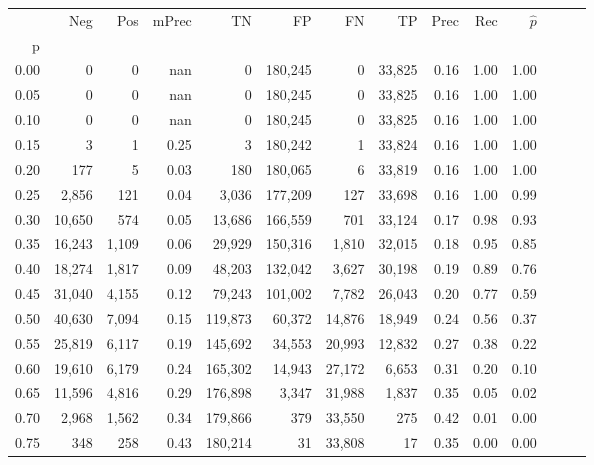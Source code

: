 \begin{tabular}{rrrrrrrrrrrrrr}
\toprule
{} &     Neg &    Pos & mPrec &       TN &       FP &      FN &      TP &  Prec &   Rec & $\hat{p}$ \\
p    &         &        &       &          &          &         &         &       &       &           \\
\midrule
0.00 &       0 &      0 &   nan &        0 &  180,245 &       0 &  33,825 &  0.16 &  1.00 &      1.00 \\
0.05 &       0 &      0 &   nan &        0 &  180,245 &       0 &  33,825 &  0.16 &  1.00 &      1.00 \\
0.10 &       0 &      0 &   nan &        0 &  180,245 &       0 &  33,825 &  0.16 &  1.00 &      1.00 \\
0.15 &       3 &      1 &  0.25 &        3 &  180,242 &       1 &  33,824 &  0.16 &  1.00 &      1.00 \\
0.20 &     177 &      5 &  0.03 &      180 &  180,065 &       6 &  33,819 &  0.16 &  1.00 &      1.00 \\
0.25 &   2,856 &    121 &  0.04 &    3,036 &  177,209 &     127 &  33,698 &  0.16 &  1.00 &      0.99 \\
0.30 &  10,650 &    574 &  0.05 &   13,686 &  166,559 &     701 &  33,124 &  0.17 &  0.98 &      0.93 \\
0.35 &  16,243 &  1,109 &  0.06 &   29,929 &  150,316 &   1,810 &  32,015 &  0.18 &  0.95 &      0.85 \\
0.40 &  18,274 &  1,817 &  0.09 &   48,203 &  132,042 &   3,627 &  30,198 &  0.19 &  0.89 &      0.76 \\
0.45 &  31,040 &  4,155 &  0.12 &   79,243 &  101,002 &   7,782 &  26,043 &  0.20 &  0.77 &      0.59 \\
0.50 &  40,630 &  7,094 &  0.15 &  119,873 &   60,372 &  14,876 &  18,949 &  0.24 &  0.56 &      0.37 \\
0.55 &  25,819 &  6,117 &  0.19 &  145,692 &   34,553 &  20,993 &  12,832 &  0.27 &  0.38 &      0.22 \\
0.60 &  19,610 &  6,179 &  0.24 &  165,302 &   14,943 &  27,172 &   6,653 &  0.31 &  0.20 &      0.10 \\
0.65 &  11,596 &  4,816 &  0.29 &  176,898 &    3,347 &  31,988 &   1,837 &  0.35 &  0.05 &      0.02 \\
0.70 &   2,968 &  1,562 &  0.34 &  179,866 &      379 &  33,550 &     275 &  0.42 &  0.01 &      0.00 \\
0.75 &     348 &    258 &  0.43 &  180,214 &       31 &  33,808 &      17 &  0.35 &  0.00 &      0.00 \\

\end{tabular}
